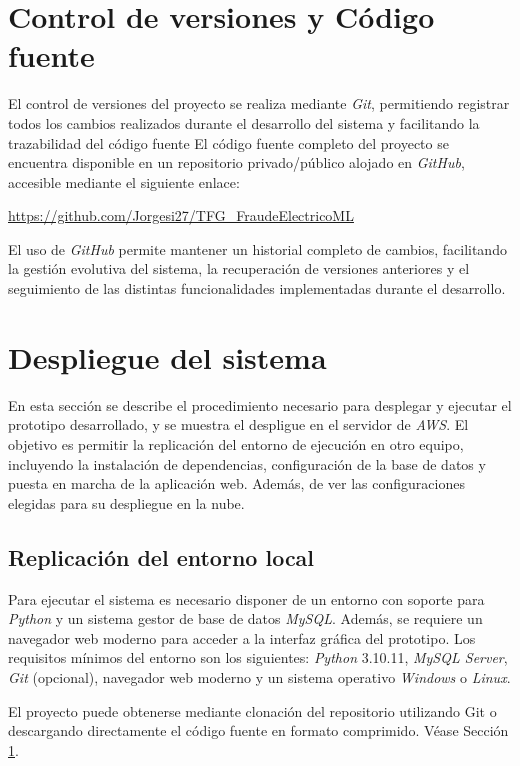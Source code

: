 \documentclass[12pt,a4paper]{report}
\begin{document}
\section{Control de versiones y Código fuente}
\label{sec:repositorio}
El control de versiones del proyecto se realiza mediante \emph{Git}, permitiendo registrar todos los cambios realizados durante el desarrollo del sistema y facilitando la trazabilidad del código fuente El código fuente completo del proyecto se encuentra disponible en un repositorio privado/público alojado en \emph{GitHub}, accesible mediante el siguiente enlace:

\begin{center}
 \url{https://github.com/Jorgesi27/TFG_FraudeElectricoML}
\end{center}

El uso de \emph{GitHub} permite mantener un historial completo de cambios, facilitando la gestión evolutiva del sistema, la recuperación de versiones anteriores y el seguimiento de las distintas funcionalidades implementadas durante el desarrollo.


\section{Despliegue del sistema}

En esta sección se describe el procedimiento necesario para desplegar y ejecutar el prototipo desarrollado, y se muestra el despligue en el servidor de \emph{AWS}. El objetivo es permitir la replicación del entorno de ejecución en otro equipo, incluyendo la instalación de dependencias, configuración de la base de datos y puesta en marcha de la aplicación web. Además, de ver las configuraciones elegidas para su despliegue en la nube.


\subsection{Replicación del entorno local}

Para ejecutar el sistema es necesario disponer de un entorno con soporte para \emph{Python} y un sistema gestor de base de datos \emph{MySQL}. Además, se requiere un navegador web moderno para acceder a la interfaz gráfica del prototipo. Los requisitos mínimos del entorno son los siguientes: \emph{Python} 3.10.11, \emph{MySQL Server}, \emph{Git} (opcional), navegador web moderno y un sistema operativo \emph{Windows} o \emph{Linux}.

El proyecto puede obtenerse mediante clonación del repositorio utilizando Git o descargando directamente el código fuente en formato comprimido. Véase Sección \ref{sec:repositorio}.
\end{document}
